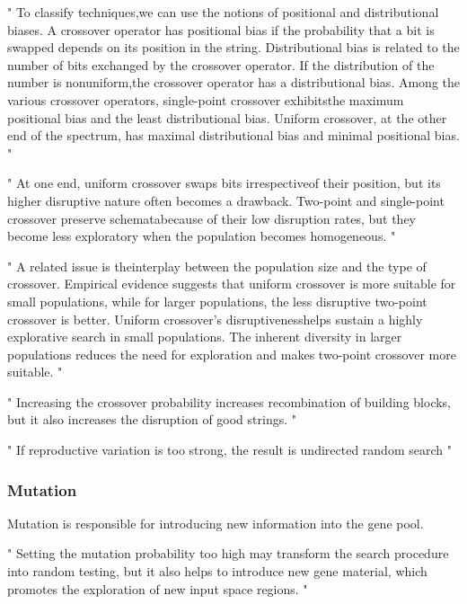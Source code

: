 "
To classify techniques,we can use the notions of positional and distributional biases. A crossover operator has positional bias if the probability that a bit is swapped depends on its position in the string. Distributional bias is related to the number of bits exchanged by the crossover operator. If the distribution of the number is nonuniform,the crossover operator has a distributional bias. Among the various crossover operators, single-point crossover exhibitsthe maximum positional bias and the least distributional bias. Uniform crossover, at the other end of the spectrum, has maximal distributional bias and minimal positional bias.
"\cite{srinivas_genetic_1994}

"
At one end, uniform crossover swaps bits irrespectiveof their position, but its higher disruptive nature often becomes a drawback. Two-point and single-point crossover preserve schematabecause of their low disruption rates, but they become less exploratory when the population becomes homogeneous.
"\cite{srinivas_genetic_1994}

"
A related issue is theinterplay between the population size and the type of crossover. Empirical evidence suggests that uniform crossover is more suitable for small populations, while for larger populations, the less disruptive two-point crossover is better. Uniform crossover’s disruptivenesshelps sustain a highly explorative search in small populations. The inherent diversity in larger populations reduces the need for exploration and makes two-point crossover more suitable.
"\cite{srinivas_genetic_1994}

"
Increasing the crossover probability increases recombination of building blocks, but it also increases the disruption of good strings.
"\cite{srinivas_genetic_1994}

"
If reproductive variation is too strong, the result is undirected random search
"\cite{kacprzyk_parameter_2007}


\subsubsection{Mutation}
Mutation is responsible for introducing new information into the gene pool.

"
Setting the mutation probability too high may transform the search procedure into random testing, but it also helps to introduce new gene material, which promotes the exploration of new input space regions.
"\cite{klampfl_using_nodate}



